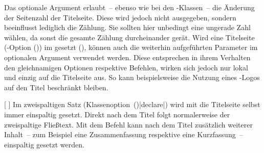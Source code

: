 \begin{Declaration*}{}
\begin{Declaration*}{}
\begin{Declaration*}{}
\begin{Declaration}
\begin{Declaration}[v2.02]{%
}
\begin{Declaration}[v2.06]{}
\begin{Declaration}[v2.02]{}
\begin{Declaration}[v2.03]{}
\begin{Declaration}[v2.03]{}
\begin{Declaration}[v2.03]{%
}
\begin{Declaration}[v2.03]{%
}
\begin{Declaration}[v2.03]{}
\begin{Declaration}[v2.03]{}
\begin{Declaration}[v2.03]{}
Das optionale Argument erlaubt~-- ebenso wie bei den \KOMAScript-Klassen~-- die
Änderung der Seitenzahl der Titelseite. Diese wird jedoch nicht ausgegeben, 
sondern beeinflusst lediglich die Zählung. Sie sollten hier unbedingt eine 
ungerade Zahl wählen, da sonst die gesamte Zählung durcheinander gerät. 
Wird eine Titelseite
(\KOMAScript-Option ()) im \TUDCD 
gesetzt (), können auch die weiterhin aufgeführten 
Parameter im optionalen Argument verwendet werden. Diese entsprechen in ihrem 
Verhalten den gleichnamigen Optionen respektive Befehlen, wirken sich jedoch 
nur lokal und einzig auf die Titelseite aus. So kann beispielsweise die Nutzung 
eines \DDC-Logos auf den Titel beschränkt bleiben.
\end{Declaration}
\end{Declaration}
\end{Declaration}
\end{Declaration}
\end{Declaration}
\end{Declaration}
\end{Declaration}
\end{Declaration}
\end{Declaration}
\end{Declaration}
\end{Declaration}

\begin{Declaration}{%
  [%
  ]%
}
\printdeclarationlist%
%
%
%
Im zweispaltigen Satz 
(Klassenoption~()|declare|) wird mit 
 die Titelseite selbst immer einspaltig gesetzt. Direkt nach 
dem Titel folgt normalerweise der zweispaltige Fließtext. Mit dem Befehl 
 kann nach dem Titel zusätzlich weiterer Inhalt~-- 
zum Beispiel eine Zusammenfassung respektive eine Kurzfassung~-- einspaltig 
gesetzt werden.


\end{Declaration}
\end{Declaration*}
\end{Declaration*}
\end{Declaration*}
